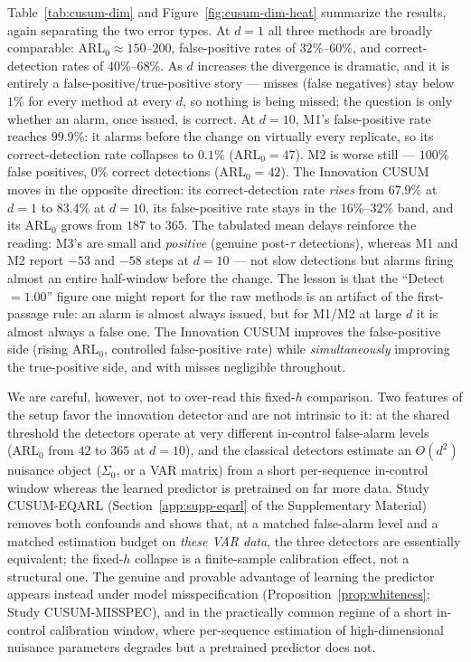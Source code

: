 \documentclass[bj,authoryear]{imsart}
\theoremstyle{plain}
\theoremstyle{definition}
\begin{document}
Table~\ref{tab:cusum-dim} and Figure~\ref{fig:cusum-dim-heat} summarize the
results, again separating the two error types.
At $d=1$ all three methods are broadly comparable: ARL$_0\approx 150$--200,
false-positive rates of $32\%$--$60\%$, and correct-detection rates of
$40\%$--$68\%$.
As $d$ increases the divergence is dramatic, and it is entirely a
false-positive/true-positive story --- misses (false negatives) stay below
$1\%$ for every method at every $d$, so nothing is being missed; the
question is only whether an alarm, once issued, is correct.
At $d=10$, M1's false-positive rate reaches $99.9\%$: it alarms before the
change on virtually every replicate, so its correct-detection rate collapses
to $0.1\%$ (ARL$_0=47$).  M2 is worse still --- $100\%$ false positives,
$0\%$ correct detections (ARL$_0=42$).
The Innovation CUSUM moves in the opposite direction: its correct-detection
rate \emph{rises} from $67.9\%$ at $d=1$ to $83.4\%$ at $d=10$, its
false-positive rate stays in the $16\%$--$32\%$ band, and its ARL$_0$ grows
from $187$ to $365$.
The tabulated mean delays reinforce the reading: M3's are small and
\emph{positive} (genuine post-$\tau$ detections), whereas M1 and M2 report
$-53$ and $-58$ steps at $d=10$ --- not slow detections but alarms firing
almost an entire half-window before the change.
The lesson is that the ``Detect$=1.00$'' figure one might report for the raw
methods is an artifact of the first-passage rule: an alarm is almost always
issued, but for M1/M2 at large $d$ it is almost always a false one.  The
Innovation CUSUM improves the false-positive side (rising ARL$_0$,
controlled false-positive rate) while \emph{simultaneously} improving the
true-positive side, and with misses negligible throughout.

We are careful, however, not to over-read this fixed-$h$ comparison.  Two
features of the setup favor the innovation detector and are not intrinsic
to it: at the shared threshold the detectors operate at very different
in-control false-alarm levels (ARL$_0$ from $42$ to $365$ at $d=10$), and
the classical detectors estimate an $O(d^2)$ nuisance object
($\Sigma_0$, or a VAR matrix) from a short per-sequence in-control window
whereas the learned predictor is pretrained on far more data.  Study
CUSUM-EQARL (Section~\ref{app:supp-eqarl} of the Supplementary Material)
removes both confounds and shows that, at a matched false-alarm level and a
matched estimation budget on \emph{these VAR data}, the three detectors are
essentially equivalent; the fixed-$h$ collapse is a finite-sample
calibration effect, not a structural one.  The genuine and provable
advantage of learning the predictor appears instead under model
misspecification (Proposition~\ref{prop:whiteness}; Study CUSUM-MISSPEC),
and in the practically common regime of a short in-control calibration
window, where per-sequence estimation of high-dimensional nuisance
parameters degrades but a pretrained predictor does not.
\end{document}

